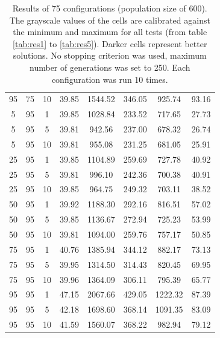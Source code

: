 \begin{table}[H]
\begin{tabular}{ccc|c|c|c|c|c}
95 & 75 & 10 & \cellcolor{gray!80}39.85 & \cellcolor{gray!1}1544.52 & \cellcolor{gray!1}346.05 & \cellcolor{gray!1}925.74 & 93.16\\
5 & 95 & 1 & \cellcolor{gray!80}39.85 & \cellcolor{gray!30}1028.84 & \cellcolor{gray!27}233.52 & \cellcolor{gray!63}717.65 & 27.73\\
5 & 95 & 5 & \cellcolor{gray!80}39.81 & \cellcolor{gray!44}942.56 & \cellcolor{gray!24}237.00 & \cellcolor{gray!75}678.32 & 26.74\\
5 & 95 & 10 & \cellcolor{gray!80}39.81 & \cellcolor{gray!42}955.08 & \cellcolor{gray!30}231.25 & \cellcolor{gray!74}681.05 & 25.91\\
25 & 95 & 1 & \cellcolor{gray!80}39.85 & \cellcolor{gray!17}1104.89 & \cellcolor{gray!3}259.69 & \cellcolor{gray!60}727.78 & 40.92\\
25 & 95 & 5 & \cellcolor{gray!80}39.81 & \cellcolor{gray!35}996.10 & \cellcolor{gray!19}242.36 & \cellcolor{gray!68}700.38 & 40.91\\
25 & 95 & 10 & \cellcolor{gray!80}39.85 & \cellcolor{gray!41}964.75 & \cellcolor{gray!13}249.32 & \cellcolor{gray!67}703.11 & 38.52\\
50 & 95 & 1 & \cellcolor{gray!79}39.92 & \cellcolor{gray!3}1188.30 & \cellcolor{gray!1}292.16 & \cellcolor{gray!32}816.51 & 57.02\\
50 & 95 & 5 & \cellcolor{gray!80}39.85 & \cellcolor{gray!12}1136.67 & \cellcolor{gray!1}272.94 & \cellcolor{gray!60}725.23 & 53.99\\
50 & 95 & 10 & \cellcolor{gray!80}39.81 & \cellcolor{gray!19}1094.00 & \cellcolor{gray!3}259.76 & \cellcolor{gray!51}757.17 & 50.85\\
75 & 95 & 1 & \cellcolor{gray!71}40.76 & \cellcolor{gray!1}1385.94 & \cellcolor{gray!1}344.12 & \cellcolor{gray!12}882.17 & 73.13\\
75 & 95 & 5 & \cellcolor{gray!79}39.95 & \cellcolor{gray!1}1314.50 & \cellcolor{gray!1}314.43 & \cellcolor{gray!31}820.45 & 69.95\\
75 & 95 & 10 & \cellcolor{gray!79}39.96 & \cellcolor{gray!1}1364.09 & \cellcolor{gray!1}306.11 & \cellcolor{gray!39}795.39 & 65.77\\
95 & 95 & 1 & \cellcolor{gray!6}47.15 & \cellcolor{gray!1}2067.66 & \cellcolor{gray!1}429.05 & \cellcolor{gray!1}1222.32 & 87.39\\
95 & 95 & 5 & \cellcolor{gray!56}42.18 & \cellcolor{gray!1}1698.60 & \cellcolor{gray!1}368.14 & \cellcolor{gray!1}1091.35 & 83.09\\
95 & 95 & 10 & \cellcolor{gray!63}41.59 & \cellcolor{gray!1}1560.07 & \cellcolor{gray!1}368.22 & \cellcolor{gray!1}982.94 & 79.12
\end{tabular}
\caption{Results of 75 configurations (population size of 600). The grayscale values of the cells are calibrated against the minimum and maximum for all tests (from table \ref{tab:res1} to \ref{tab:res5}). Darker cells represent better solutions. No stopping criterion was used, maximum number of generations was set to 250. Each configuration was run 10 times.}
\label{tab:res3}
\end{table}

